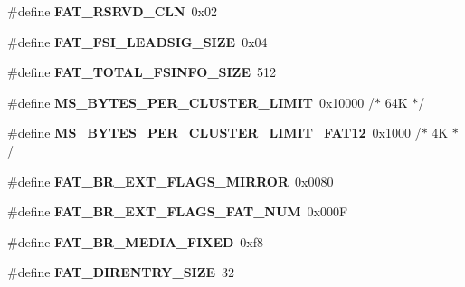 \begin{DoxyCompactItemize}
\item 
\mbox{\label{group__libfs__dosfs_ga59e649d1c1fbc60e87d53316703ade9f}} 
\#define {\bfseries F\+A\+T\+\_\+\+R\+S\+R\+V\+D\+\_\+\+C\+LN}~0x02
\item 
\mbox{\label{group__libfs__dosfs_gabd53206ac9c0dcbaf52bb113ec943642}} 
\#define {\bfseries F\+A\+T\+\_\+\+F\+S\+I\+\_\+\+L\+E\+A\+D\+S\+I\+G\+\_\+\+S\+I\+ZE}~0x04
\item 
\mbox{\label{group__libfs__dosfs_ga5a68dc92abb2d92fbf64239be3f54655}} 
\#define {\bfseries F\+A\+T\+\_\+\+T\+O\+T\+A\+L\+\_\+\+F\+S\+I\+N\+F\+O\+\_\+\+S\+I\+ZE}~512
\item 
\mbox{\label{group__libfs__dosfs_ga99473c3880e15f66ca2b592c8a561c0d}} 
\#define {\bfseries M\+S\+\_\+\+B\+Y\+T\+E\+S\+\_\+\+P\+E\+R\+\_\+\+C\+L\+U\+S\+T\+E\+R\+\_\+\+L\+I\+M\+IT}~0x10000    /$\ast$ 64\+K $\ast$/
\item 
\mbox{\label{group__libfs__dosfs_gad9bc79cb57dfd9098878274e473b9d4f}} 
\#define {\bfseries M\+S\+\_\+\+B\+Y\+T\+E\+S\+\_\+\+P\+E\+R\+\_\+\+C\+L\+U\+S\+T\+E\+R\+\_\+\+L\+I\+M\+I\+T\+\_\+\+F\+A\+T12}~0x1000     /$\ast$  4\+K $\ast$/
\item 
\mbox{\label{group__libfs__dosfs_ga2f144eaae4ac0ee55075d7a3b3234802}} 
\#define {\bfseries F\+A\+T\+\_\+\+B\+R\+\_\+\+E\+X\+T\+\_\+\+F\+L\+A\+G\+S\+\_\+\+M\+I\+R\+R\+OR}~0x0080
\item 
\mbox{\label{group__libfs__dosfs_gac3a28cbc27fabf3fdf73d7fc84f5b7f9}} 
\#define {\bfseries F\+A\+T\+\_\+\+B\+R\+\_\+\+E\+X\+T\+\_\+\+F\+L\+A\+G\+S\+\_\+\+F\+A\+T\+\_\+\+N\+UM}~0x000F
\item 
\mbox{\label{group__libfs__dosfs_ga71986252278aac89dfb570883bf0c16b}} 
\#define {\bfseries F\+A\+T\+\_\+\+B\+R\+\_\+\+M\+E\+D\+I\+A\+\_\+\+F\+I\+X\+ED}~0xf8
\item 
\mbox{\label{group__libfs__dosfs_ga816e74b186b16153e4294fc9630e8999}} 
\#define {\bfseries F\+A\+T\+\_\+\+D\+I\+R\+E\+N\+T\+R\+Y\+\_\+\+S\+I\+ZE}~32

\end{DoxyCompactItemize}
